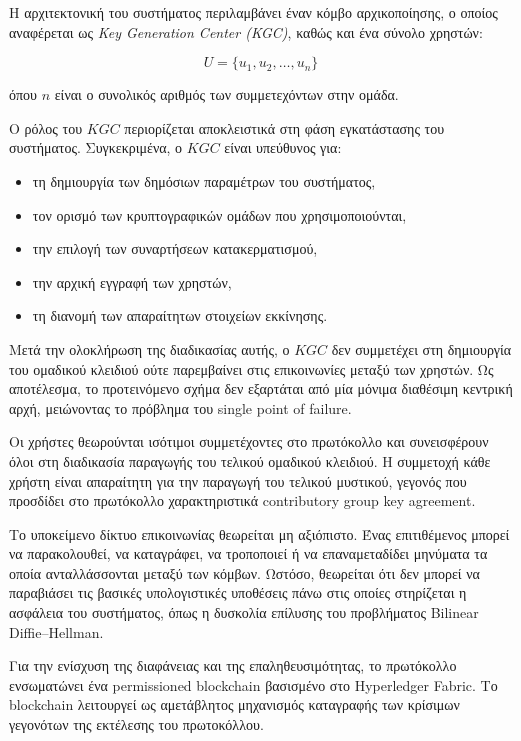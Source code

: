 \documentclass[12pt,a4paper]{report}
\begin{document}
Η αρχιτεκτονική του συστήματος περιλαμβάνει έναν κόμβο αρχικοποίησης, ο οποίος αναφέρεται ως \textit{Key Generation Center (KGC)}, καθώς και ένα σύνολο χρηστών:

\[
U = \{u_1,u_2,\ldots,u_n\}
\]

όπου $n$ είναι ο συνολικός αριθμός των συμμετεχόντων στην ομάδα.

Ο ρόλος του $KGC$ περιορίζεται αποκλειστικά στη φάση εγκατάστασης του συστήματος. Συγκεκριμένα, ο $KGC$ είναι υπεύθυνος για:

\begin{itemize}
\item τη δημιουργία των δημόσιων παραμέτρων του συστήματος,
\item τον ορισμό των κρυπτογραφικών ομάδων που χρησιμοποιούνται,
\item την επιλογή των συναρτήσεων κατακερματισμού,
\item την αρχική εγγραφή των χρηστών,
\item τη διανομή των απαραίτητων στοιχείων εκκίνησης.
\end{itemize}

Μετά την ολοκλήρωση της διαδικασίας αυτής, ο $KGC$ δεν συμμετέχει στη δημιουργία του ομαδικού κλειδιού ούτε παρεμβαίνει στις επικοινωνίες μεταξύ των χρηστών. Ως αποτέλεσμα, το προτεινόμενο σχήμα δεν εξαρτάται από μία μόνιμα διαθέσιμη κεντρική αρχή, μειώνοντας το πρόβλημα του single point of failure.

Οι χρήστες θεωρούνται ισότιμοι συμμετέχοντες στο πρωτόκολλο και συνεισφέρουν όλοι στη διαδικασία παραγωγής του τελικού ομαδικού κλειδιού. Η συμμετοχή κάθε χρήστη είναι απαραίτητη για την παραγωγή του τελικού μυστικού, γεγονός που προσδίδει στο πρωτόκολλο χαρακτηριστικά contributory group key agreement.

Το υποκείμενο δίκτυο επικοινωνίας θεωρείται μη αξιόπιστο. Ένας επιτιθέμενος μπορεί να παρακολουθεί, να καταγράφει, να τροποποιεί ή να επαναμεταδίδει μηνύματα τα οποία ανταλλάσσονται μεταξύ των κόμβων. Ωστόσο, θεωρείται ότι δεν μπορεί να παραβιάσει τις βασικές υπολογιστικές υποθέσεις πάνω στις οποίες στηρίζεται η ασφάλεια του συστήματος, όπως η δυσκολία επίλυσης του προβλήματος Bilinear Diffie--Hellman.

Για την ενίσχυση της διαφάνειας και της επαληθευσιμότητας, το πρωτόκολλο ενσωματώνει ένα permissioned blockchain βασισμένο στο Hyperledger Fabric. Το blockchain λειτουργεί ως αμετάβλητος μηχανισμός καταγραφής των κρίσιμων γεγονότων της εκτέλεσης του πρωτοκόλλου.
\end{document}
